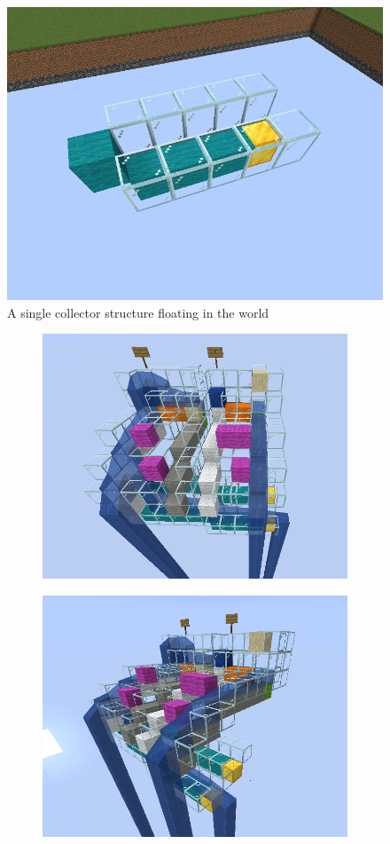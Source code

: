 \begin{figure}[h]
    \centering
    \includegraphics[width=0.5\linewidth]{images/collector.png}
    \caption{A single collector structure floating in the world}
    \label{fig:collector}
\end{figure}


\begin{figure}[h]
\centering
\begin{subfigure}{.33\textwidth}
  \centering
  \includegraphics[width=.9\linewidth]{images/small_example_front.png}
\end{subfigure}%
\begin{subfigure}{.33\textwidth}
  \centering
  \includegraphics[width=.9\linewidth]{images/small_example_angle.png}

\end{subfigure}
\end{figure}
